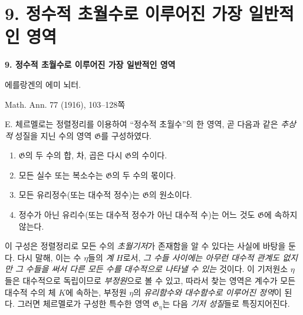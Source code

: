 
\section*{9. 정수적 초월수로 이루어진 가장 일반적인 영역}
\begin{center}
{\Large\bfseries 9. 정수적 초월수로 이루어진 가장 일반적인 영역}\par
\vspace{0.75em}
에를랑겐의 에미 뇌터.\par
\vspace{1.2em}
Math. Ann. 77 (1916), 103--128쪽
\end{center}

E. 체르멜로는 정렬정리를 이용하여 ``정수적 초월수''의 한 영역, 곧 다음과 같은 \emph{추상적} 성질을 지닌 수의 영역 $\mathfrak G$를 구성하였다.
\begin{enumerate}
\item[I.] $\mathfrak G$의 두 수의 합, 차, 곱은 다시 $\mathfrak G$의 수이다.
\item[II.] 모든 실수 또는 복소수는 $\mathfrak G$의 두 수의 몫이다.
\item[III.] 모든 유리정수(또는 대수적 정수)는 $\mathfrak G$의 원소이다.
\item[IV.] 정수가 아닌 유리수(또는 대수적 정수가 아닌 대수적 수)는 어느 것도 $\mathfrak G$에 속하지 않는다.
\end{enumerate}

이 구성은 정렬정리로 모든 수의 \emph{초월기저}가 존재함을 알 수 있다는 사실에 바탕을 둔다. 다시 말해, 이는 수 $\eta$들의 \emph{계} $H$로서, \emph{그 수들 사이에는 아무런 대수적 관계도 없지만 그 수들을 써서 다른 모든 수를 대수적으로 나타낼 수 있는} 것이다. 이 기저원소 $\eta$들은 대수적으로 독립이므로 \emph{부정원}으로 볼 수 있고, 따라서 찾는 영역은 계수가 모든 대수적 수의 체 $K$에 속하는, 부정원 $\eta$의 \emph{유리함수와 대수함수로 이루어진 정역}이 된다. 그러면 체르멜로가 구성한 특수한 영역 $\mathfrak G_\eta$는 다음 \emph{기저 성질}들로 특징지어진다.

